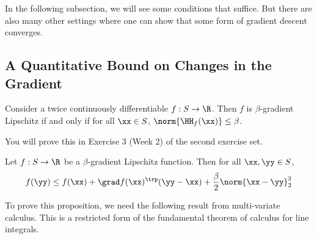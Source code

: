 In the following subsection, we will see some conditions that
suffice.
But there are also many other settings where one can show that some
form of gradient descent converges.

\subsection{A Quantitative Bound on Changes in the Gradient}

\begin{proposition}
\label{prp:hessiangradlip}
  Consider a twice continuously differentiable $f: S \to \R$.
  Then $f$ is $\beta$-gradient Lipschitz if and only if for all $\xx \in
 S$,
  $\norm{\HH_f(\xx)} \leq \beta$.
\end{proposition}
 You will prove this in Exercise 3 (Week 2) of the second exercise set.

\begin{proposition}
  \label{prp:lipgradub}
  Let $f: S \to \R$ be a $\beta$-gradient Lipschitz function.
  Then for all $\xx, \yy \in S$,
  \[
    f(\yy) \leq f(\xx) + \grad f(\xx)^\trp (\yy-\xx) + \frac{\beta}{2}
    \norm{\xx-\yy}_2^2
    \]
\end{proposition}

To prove this proposition, we need the following result from
multi-variate calculus. This is a restricted form of the fundamental
theorem of calculus for line integrals.


